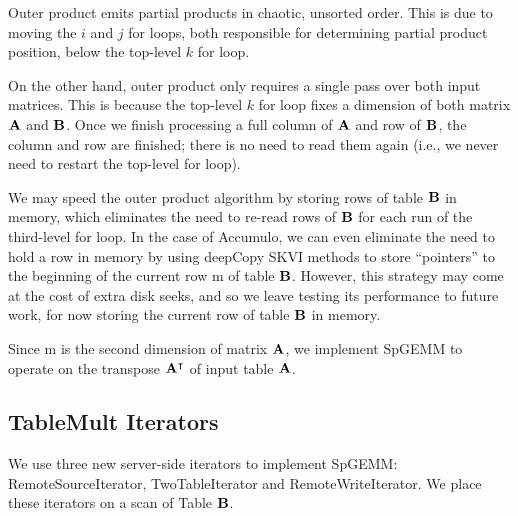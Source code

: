 Outer product emits partial products in chaotic, unsorted order.
This is due to moving the $i$ and $j$ for loops, both responsible for determining partial product position,
below the top-level $k$ for loop.

On the other hand, outer product only requires a single pass over both input matrices.
This is because the top-level $k$ for loop fixes a dimension of both matrix $\mathbf{A}$ and $\mathbf{B}$.
Once we finish processing a full column of $\mathbf{A}$ and row of $\mathbf{B}$, the column and row are finished;
there is no need to read them again (i.e., we never need to restart the top-level for loop).

We may speed the outer product algorithm by storing rows of table $\mathbf{B}$ in memory,
which eliminates the need to re-read rows of $\mathbf{B}$ for each run of the third-level for loop.
In the case of Accumulo, we can even eliminate the need to hold a row in memory by using
deepCopy SKVI methods to store ``pointers'' to the beginning of the current row m of table $\mathbf{B}$.
However, this strategy may come at the cost of extra disk seeks, and so
we leave testing its performance to future work, for now storing the current row of table $\mathbf{B}$ in memory.

Since m is the second dimension of matrix $\mathbf{A}$, we implement 
SpGEMM to operate on the transpose $\mathbf{A^{\intercal}}$ of input table $\mathbf{A}$.



\subsection{TableMult Iterators}
We use three new server-side iterators to implement SpGEMM: 
RemoteSourceIterator, TwoTableIterator and RemoteWriteIterator.
We place these iterators on a scan of Table $\mathbf{B}$. 

